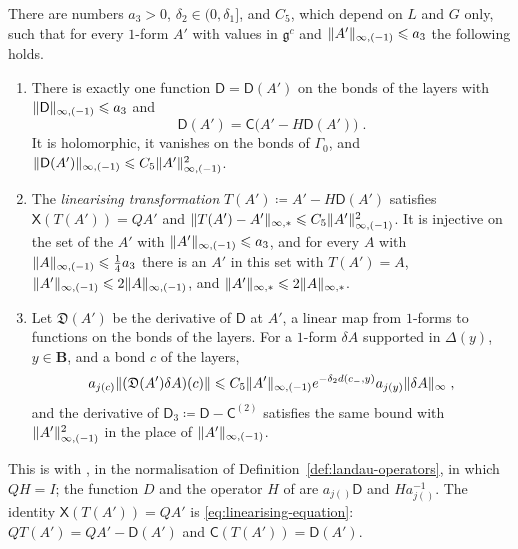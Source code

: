 \documentclass[11pt]{preprint}
\makeatletter
\DeclarePairedDelimiter{\norm}{\lVert}{\rVert}
\newcommand*{\bigcdot}{}%
\DeclareRobustCommand*{\bigcdot}{%
	\mathbin{\mathpalette\bigcdot@{}}%
}
\newcommand*{\bigcdot@scalefactor}{.7}
\newcommand*{\bigcdot@widthfactor}{1.15}
\newcommand*{\bigcdot@}[2]{%
	\sbox0{$#1\vcenter{}$}%
	\sbox2{$#1\cdot\m@th$}%
	\hbox to \bigcdot@widthfactor\wd2{%
		\hss
		\raise\ht0\hbox{%
			\scalebox{\bigcdot@scalefactor}{%
				\lower\ht0\hbox{$#1\bullet\m@th$}%
			}%
		}%
		\hss
	}%
}
\numberwithin{equation}{section}
\makeatother
\begin{document}
\begin{proposition}\label{prop:linearising}
There are numbers $a_3 > 0$, $\delta_2 \in (0, \delta_1]$, and $C_5$, which depend on $L$ and $G$ only, such that for every $1$-form $A'$ with values in $\mathfrak g^c$ and $\norm{A'}_{\infty,(-1)} \leqslant a_3$ the following holds.
\begin{enumerate}[label=(\roman*)]
\item There is exactly one function $\mathsf D = \mathsf D(A')$ on the bonds of the layers with $\norm{\mathsf D}_{\infty,(-1)} \leqslant a_3$ and
\begin{equation}\label{eq:linearising-equation}
    \mathsf D(A') = \mathsf C\bigl(A' - H\mathsf D(A')\bigr)\;.
\end{equation}
It is holomorphic, it vanishes on the bonds of $\Gamma_0$, and $\norm{\mathsf D(A')}_{\infty,(-1)} \leqslant C_5\norm{A'}_{\infty,(-1)}^2$.
\item The \emph{linearising transformation} $T(A') \coloneqq A' - H\mathsf D(A')$ satisfies $\mathsf X(T(A')) = QA'$ and $\norm{T(A') - A'}_{\infty,*} \leqslant C_5\norm{A'}_{\infty,(-1)}^2$. It is injective on the set of the $A'$ with $\norm{A'}_{\infty,(-1)} \leqslant a_3$, and for every $A$ with $\norm A_{\infty,(-1)} \leqslant \frac{1}{4}a_3$ there is an $A'$ in this set with $T(A') = A$, $\norm{A'}_{\infty,(-1)} \leqslant 2\norm A_{\infty,(-1)}$, and $\norm{A'}_{\infty,*} \leqslant 2\norm A_{\infty,*}$.
\item Let $\mathfrak D(A')$ be the derivative of $\mathsf D$ at $A'$, a linear map from $1$-forms to functions on the bonds of the layers. For a $1$-form $\delta A$ supported in $\Delta(y)$, $y \in \mathbf B$, and a bond $c$ of the layers,
\begin{equation}\label{eq:linearising-derivative}
    a_{j(c)}\norm{(\mathfrak D(A')\delta A)(c)} \leqslant C_5\norm{A'}_{\infty,(-1)}e^{-\delta_2d(c_-, y)}a_{j(y)}\norm{\delta A}_\infty\;,
\end{equation}
and the derivative of $\mathsf D_3 \coloneqq \mathsf D - \mathsf C^{(2)}$ satisfies the same bound with $\norm{A'}_{\infty,(-1)}^2$ in the place of $\norm{A'}_{\infty,(-1)}$.
\end{enumerate}
\end{proposition}

This is \cite[Proposition~3, p.~289]{BalabanVAR} with \cite[(49)--(62), (73)]{BalabanVAR}, in the normalisation of Definition~\ref{def:landau-operators}, in which $QH = I$; the function $D$ and the operator $H$ of \cite{BalabanVAR} are $a_{j(\bigcdot)}\mathsf D$ and $Ha_{j(\bigcdot)}^{-1}$. The identity $\mathsf X(T(A')) = QA'$ is \eqref{eq:linearising-equation}: $QT(A') = QA' - \mathsf D(A')$ and $\mathsf C(T(A')) = \mathsf D(A')$.
\end{document}
